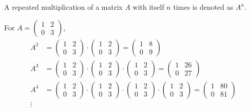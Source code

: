 A repeated multiplication of a matrix $A$ with itself $n$ times is denoted as $A^{n}$.
\begin{example}
 
  For $A=\begin{pmatrix}1&2\\0&3\end{pmatrix}$,
  \begin{align*}
	A^{2} &= \begin{pmatrix}1&2\\0&3\end{pmatrix}\cdot\begin{pmatrix}1&2\\0&3\end{pmatrix} = \begin{pmatrix}1&8\\0&9\end{pmatrix}\\[3mm]
	A^{3} &= \begin{pmatrix}1&2\\0&3\end{pmatrix}\cdot\begin{pmatrix}1&2\\0&3\end{pmatrix}\cdot\begin{pmatrix}1&2\\0&3\end{pmatrix} = \begin{pmatrix}1&26\\0&27\end{pmatrix}\\[3mm]
	A^{4} &= \begin{pmatrix}1&2\\0&3\end{pmatrix}\cdot\begin{pmatrix}1&2\\0&3\end{pmatrix}\cdot\begin{pmatrix}1&2\\0&3\end{pmatrix}\cdot\begin{pmatrix}1&2\\0&3\end{pmatrix} = \begin{pmatrix}1&80\\0&81\end{pmatrix}\\[3mm]
	\vdots
  \end{align*}
\end{example}

